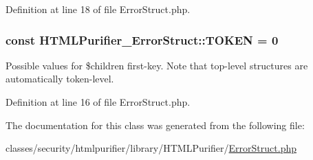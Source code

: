 Definition at line 18 of file Error\+Struct.\+php.

\hypertarget{classHTMLPurifier__ErrorStruct_a50a2f9b5eb12a953ab5d37baa2928733}{
\subsubsection[{T\+O\+K\+E\+N}]{\setlength{\rightskip}{0pt plus 5cm}const H\+T\+M\+L\+Purifier\+\_\+\+Error\+Struct\+::\+T\+O\+K\+E\+N = 0}}\label{classHTMLPurifier__ErrorStruct_a50a2f9b5eb12a953ab5d37baa2928733}
Possible values for \$children first-\/key. Note that top-\/level structures are automatically token-\/level. 

Definition at line 16 of file Error\+Struct.\+php.



The documentation for this class was generated from the following file\+:\begin{DoxyCompactItemize}
\item 
classes/security/htmlpurifier/library/\+H\+T\+M\+L\+Purifier/\hyperlink{ErrorStruct_8php}{Error\+Struct.\+php}\end{DoxyCompactItemize}
